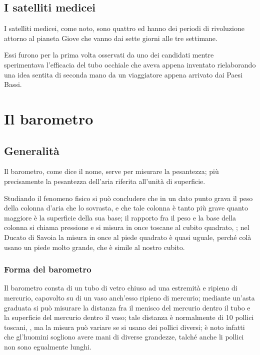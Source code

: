 \documentclass[%
    corpo=11pt,
    twoside,
    oldstyle,
    autoretitolo,
    tipotesi=dottorale,
    greek,
    evenboxes,
]{toptesi}
\begin{document}
{\section{I satelliti medicei}
I satelliti medicei, come noto, sono quattro ed hanno dei periodi di rivoluzione
attorno al pianeta Giove che vanno dai sette giorni alle tre settimane.

Essi furono per la prima volta osservati da uno dei candidati mentre
sperimentava l'efficacia del tubo occhiale che aveva appena inventato
rielaborando una idea sentita di seconda mano da un viaggiatore appena arrivato
dai Paesi Bassi.





\chapter{Il barometro}
\section{Generalità}
\begin{interlinea}{0.87} Il barometro, come dice il nome, serve per
misurare la pesantezza; più precisamente la pesantezza dell'aria
riferita all'unità di superficie.
\end{interlinea}

\begin{interlinea}{2} Studiando il fenomeno fisico si può concludere
che in un dato punto grava il peso della colonna d'aria che lo
sovrasta, e che tale colonna è tanto più grave quanto maggiore
è la superficie della sua base; il rapporto fra il peso e la base
della colonna si chiama pressione e si misura in once toscane al cubito
quadrato, \cite{tor1}; nel Ducato di Savoia la misura in once al piede
quadrato è quasi uguale, perché colà usano un piede molto
grande, che è simile al nostro cubito.
\end{interlinea}

\subsection{Forma del barometro}
Il barometro consta di un tubo di vetro chiuso ad una estremità e
ripieno di mercurio, capovolto su di un vaso anch'esso ripieno di
mercurio; mediante un'asta graduata si può misurare la distanza fra
il menisco del mercurio dentro il tubo e la superficie del mercurio
dentro il vaso; tale distanza è normalmente di 10 pollici toscani,
\cite{tor1,tor2}, ma la misura può variare se si usano dei pollici
diversi; è noto infatti che gl'huomini sogliono avere mani di
diverse grandezze, talché anche li pollici non sono egualmente
lunghi.
}
\end{document}
